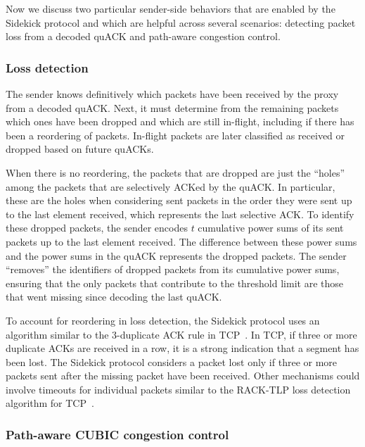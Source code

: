 Now we discuss two particular sender-side behaviors that are enabled by the
Sidekick protocol and which are helpful across several scenarios: detecting
packet loss from a decoded quACK and path-aware congestion control.


\subsubsection{Loss detection}
\label{sec:sidekick:sender:loss-detection}

The sender knows definitively which packets have been received by the proxy from
a decoded quACK. Next, it must determine from the remaining packets which ones
have been dropped and which are still in-flight, including if there has been a
reordering of packets. In-flight packets are later classified as received or
dropped based on future quACKs.

When there is no reordering, the packets that are dropped are just the ``holes''
among the packets that are selectively ACKed by the quACK. In particular, these
are the holes when considering sent packets in the order they were sent up to
the last element received, which represents the last selective ACK. To identify
these dropped packets, the sender encodes $t$ cumulative power sums of its sent
packets up to the last element received. The difference between these power
sums and the power sums in the quACK represents the dropped packets. The sender
``removes'' the identifiers of dropped packets from its cumulative power sums,
ensuring that the only packets that contribute to the threshold limit are those
that went missing since decoding the last quACK.

To account for reordering in loss detection, the Sidekick protocol uses an
algorithm similar to the 3-duplicate ACK rule in
TCP~\cite{rfc5681tcp,rfc2001tcp}. In TCP, if three or more duplicate ACKs are
received in a row, it is a strong indication that a segment has been lost. The
Sidekick protocol considers a packet lost only if three or more packets sent
after the missing packet have been received. Other mechanisms could involve
timeouts for individual packets similar to the RACK-TLP loss detection
algorithm for TCP~\cite{rfc8985}.


\subsubsection{Path-aware CUBIC congestion control}
\label{sec:sidekick:sender:pacubic}

